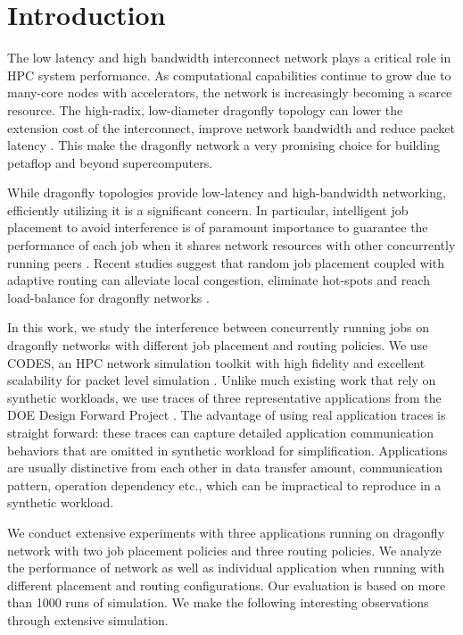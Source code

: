\section{Introduction}
\label{sec:intro}

The low latency and high bandwidth interconnect network plays a critical role in HPC system performance. As computational capabilities continue to grow due to many-core nodes with accelerators, the network is increasingly becoming a scarce resource. The high-radix, low-diameter dragonfly topology can lower the extension cost of the interconnect, improve network bandwidth and reduce packet latency \cite{dally-dragonfly}. This make the dragonfly network a very promising choice for building petaflop and beyond supercomputers. 


While dragonfly topologies provide low-latency and high-bandwidth networking, efficiently utilizing it is a significant concern. In particular, intelligent job placement to avoid interference is of paramount importance to guarantee the performance of each job when it shares network resources with other concurrently running peers \cite{bhatele2015, dskinner}. Recent studies suggest that random job placement coupled with adaptive routing can alleviate local congestion, eliminate hot-spots and reach load-balance for dragonfly networks \cite{jain-sc14, bhatele-sc11, brandt2014}. 


In this work, we study the interference between concurrently running jobs on dragonfly networks with different job placement and routing policies. We use CODES, an HPC network simulation toolkit with high fidelity and excellent scalability for packet level simulation \cite{codes}. Unlike much existing work that rely on synthetic workloads, we use traces of three representative applications from the DOE Design Forward Project \cite{designforwardwebpage}. The advantage of using real application traces is straight forward: these traces can capture detailed application communication behaviors that are  omitted in synthetic workload for simplification. Applications are usually distinctive from each other in data transfer amount, communication pattern, operation dependency etc., which can be impractical to reproduce in a synthetic workload.

We conduct extensive experiments with three applications running on dragonfly network with two job placement policies and three routing policies. We analyze the performance of network as well as individual application when running with different placement and routing configurations. Our evaluation is based on more than 1000 runs of simulation. We make the following interesting observations through extensive simulation.


